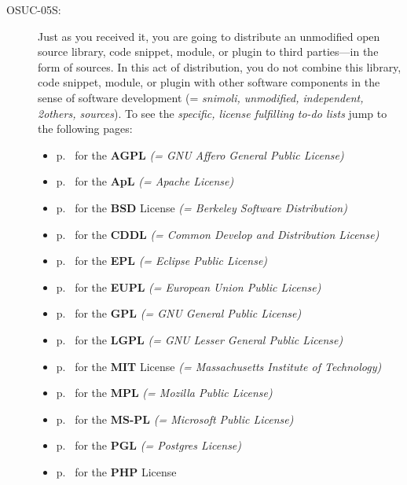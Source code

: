 \begin{description}
\item[OSUC-05S:]\label{OSUC-05S-DEF} Just as you received it, you are going to
distribute an unmodified open source library, code snippet, module, or plugin to
third parties---in the form of sources. In this act of distribution, you do not
combine this library, code snippet, module, or plugin with other software
components in the sense of software development (= \textit{snimoli, unmodified,
independent, 2others, sources}). To see the \textit{specific, license fulfilling
to-do lists} jump to the following pages:
  \begin{itemize}
    \item p.\ \pageref{OSUC-05S-AGPL} for the \textbf{AGPL}
      \textit{(= GNU Affero General Public License)} 
    \item p.\ \pageref{OSUC-05S-Apache20} for the \textbf{ApL}
      \textit{(= Apache License)}
    \item p.\ \pageref{OSUC-05S-BSD} for the \textbf{BSD} License
      \textit{(= Berkeley Software Distribution)}
    \item p.\ \pageref{OSUC-05S-CDDL} for the \textbf{CDDL}
      \textit{(= Common Develop and Distribution License)}  
    \item p.\ \pageref{OSUC-05S-EPL} for the \textbf{EPL}
      \textit{(= Eclipse Public License)}     
    \item p.\ \pageref{OSUC-05S-EUPL} for the \textbf{EUPL}
      \textit{(= European Union Public License)} 
    \item p.\ \pageref{OSUC-05S-GPL} for the \textbf{GPL}
       \textit{(= GNU General Public License)} 
    \item p.\ \pageref{OSUC-05S-LGPL} for the \textbf{LGPL}
      \textit{(= GNU Lesser General Public License)}           
    \item p.\ \pageref{OSUC-05S-MIT} for the \textbf{MIT} License
       \textit{(= Massachusetts Institute of Technology)} 
    \item p.\ \pageref{OSUC-05S-MPL} for the \textbf{MPL}
      \textit{(= Mozilla Public License)}     
    \item p.\ \pageref{OSUC-05S-MS-PL} for the \textbf{MS-PL}
      \textit{(= Microsoft Public License)} 
    \item p.\ \pageref{OSUC-05S-PGL} for the \textbf{PGL}
      \textit{(= Postgres License)} 
    \item p.\ \pageref{OSUC-05S-PHP} for the \textbf{PHP} License 
  \end{itemize}


\end{description}
